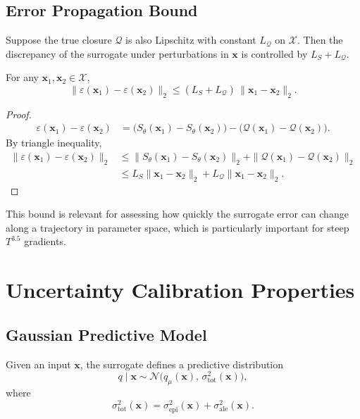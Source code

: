 \documentclass[11pt]{article}
\begin{document}
\subsection{Error Propagation Bound}

Suppose the true closure $\mathcal{Q}$ is also Lipschitz with constant $L_{\mathcal{Q}}$ on $\mathcal{X}$. Then the discrepancy of the surrogate under perturbations in $\bm{x}$ is controlled by $L_S + L_{\mathcal{Q}}$.

\begin{corollary}
For any $\bm{x}_1, \bm{x}_2 \in \mathcal{X}$,
\[
  \|\varepsilon(\bm{x}_1) - \varepsilon(\bm{x}_2)\|_2 \le (L_S + L_{\mathcal{Q}}) \, \|\bm{x}_1 - \bm{x}_2\|_2.
\]
\end{corollary}

\begin{proof}
\begin{align*}
  \varepsilon(\bm{x}_1) - \varepsilon(\bm{x}_2)
  &= \big(S_\theta(\bm{x}_1) - S_\theta(\bm{x}_2)\big) - \big(\mathcal{Q}(\bm{x}_1) - \mathcal{Q}(\bm{x}_2)\big).
\end{align*}
By triangle inequality,
\begin{align*}
  \|\varepsilon(\bm{x}_1) - \varepsilon(\bm{x}_2)\|_2
  &\le \|S_\theta(\bm{x}_1) - S_\theta(\bm{x}_2)\|_2 + \|\mathcal{Q}(\bm{x}_1) - \mathcal{Q}(\bm{x}_2)\|_2 \\
  &\le L_S \|\bm{x}_1 - \bm{x}_2\|_2 + L_{\mathcal{Q}} \|\bm{x}_1 - \bm{x}_2\|_2.
\end{align*}
\end{proof}

This bound is relevant for assessing how quickly the surrogate error can change along a trajectory in parameter space, which is particularly important for steep $T^{3.5}$ gradients.

\section{Uncertainty Calibration Properties}

\subsection{Gaussian Predictive Model}

Given an input $\bm{x}$, the surrogate defines a predictive distribution
\[
  q \mid \bm{x} \sim \mathcal{N}\big(q_\mu(\bm{x}),\, \sigma_{\mathrm{tot}}^2(\bm{x})\big),
\]
where
\[
  \sigma_{\mathrm{tot}}^2(\bm{x}) = \sigma_{\mathrm{epi}}^2(\bm{x}) + \sigma_{\mathrm{ale}}^2(\bm{x}).
\]
\end{document}
